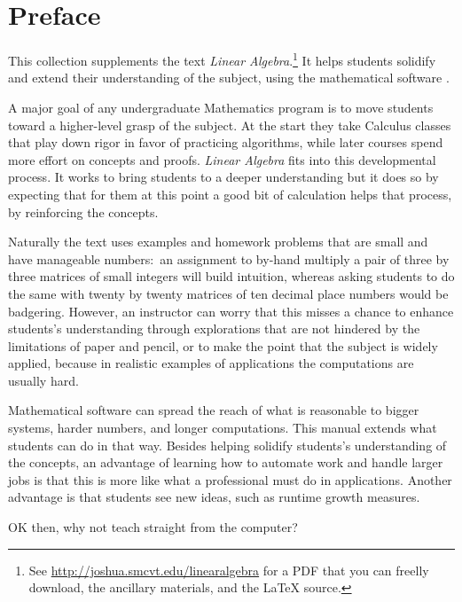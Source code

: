 \chapter*{Preface}\pagestyle{preface}\thispagestyle{preface}
\setlength{\parskip}{.25ex}


This collection supplements the text \nocite{Hefferon12}
\textit{Linear Algebra}.\footnote{See 
\protect\url{http://joshua.smcvt.edu/linearalgebra}
for a PDF that you can freelly download, the ancillary materials, and
the \protect\LaTeX{} source.}
It helps students
solidify and extend their understanding of the subject, 
using the mathematical software \Sage{}.%

A major goal of any undergraduate Mathematics program is to move students 
toward a higher-level grasp of the subject.
At the start they take Calculus classes that play down 
rigor in favor of practicing algorithms, while
later courses spend more effort on concepts and proofs.
\textit{Linear Algebra} fits into this developmental process.
It works to bring students to a deeper understanding 
but it does so by expecting
that for them at this point a good bit of calculation helps that process,
by reinforcing the concepts. 

Naturally the text uses examples and homework problems
that are small and have manageable numbers:~an 
assignment to by-hand multiply a pair of three by three matrices
of small integers will build intuition, whereas asking students to do the same
with twenty by twenty matrices
of ten decimal place numbers would be badgering. 
However, an instructor can worry that this misses a chance
to enhance students's understanding through explorations that are not 
hindered by the limitations of paper and pencil,
or to make the point that the subject is widely applied, because in 
realistic examples of 
applications the computations are usually hard. 

Mathematical software can spread the reach of
what is reasonable 
to bigger systems, harder numbers, and longer computations.
This manual extends what students can do in that way.
Besides helping solidify students's understanding of the concepts,
an advantage of learning how to automate work and
handle larger jobs is that 
this is more like what a professional must do in applications.
Another advantage is that students see new ideas, such as 
runtime growth measures.

OK then, why 
not teach straight from the computer?


